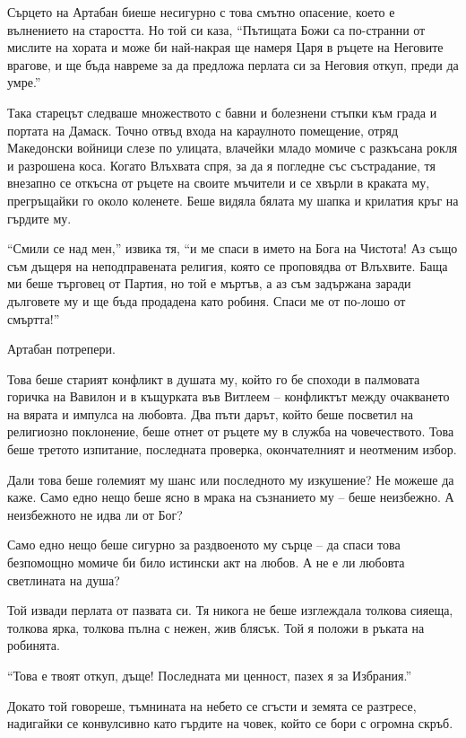 \documentclass[oneside,10pt]{memoir}
\begin{document}
Сърцето на Артабан биеше несигурно с това смътно опасение, което
е вълнението на старостта. Но той си каза, ``Пътищата Божи са по-странни от
мислите на хората и може би най-накрая ще намеря Царя в ръцете на Неговите
врагове, и ще бъда навреме за да предложа перлата си за Неговия откуп, преди да
умре.''

Така старецът следваше множеството с бавни и болезнени стъпки към града и
портата на Дамаск. Точно отвъд входа на караулното помещение, отряд Македонски
войници слезе по улицата, влачейки младо момиче с разкъсана рокля и разрошена
коса. Когато Влъхвата спря, за да я погледне със състрадание, тя внезапно се
откъсна от ръцете на своите мъчители и се хвърли в краката му, прегръщайки го
около коленете. Беше видяла бялата му шапка и крилатия кръг на гърдите му.

``Смили се над мен,'' извика тя, ``и ме спаси в името на Бога на Чистота! Аз
също съм дъщеря на неподправената религия, която се проповядва от Влъхвите. Баща
ми беше търговец от Партия, но той е мъртъв, а аз съм задържана заради дълговете
му и ще бъда продадена като робиня. Спаси ме от по-лошо от смъртта!''

Артабан потрепери.

Това беше старият конфликт в душата му, който го бе споходи в палмовата горичка
на Вавилон и в къщурката във Витлеем -- конфликтът между очакването на вярата и
импулса на любовта. Два пъти дарът, който беше посветил на религиозно
поклонение, беше отнет от ръцете му в служба на човечеството. Това беше третото
изпитание, последната проверка, окончателният и неотменим избор.

Дали това беше големият му шанс или последното му изкушение? Не можеше да каже.
Само едно нещо беше ясно в мрака на съзнанието му -- беше неизбежно. А
неизбежното не идва ли от Бог?

Само едно нещо беше сигурно за раздвоеното му сърце -- да спаси това безпомощно
момиче би било истински акт на любов. А не е ли любовта светлината на душа?

Той извади перлата от пазвата си. Тя никога не беше изглеждала толкова сияеща,
толкова ярка, толкова пълна с нежен, жив блясък. Той я положи в ръката на
робинята.

``Това е твоят откуп, дъще! Последната ми ценност, пазех я за Избрания.''

Докато той говореше, тъмнината на небето се сгъсти и земята се разтресе,
надигайки се конвулсивно като гърдите на човек, който се бори с огромна скръб.
\end{document}
